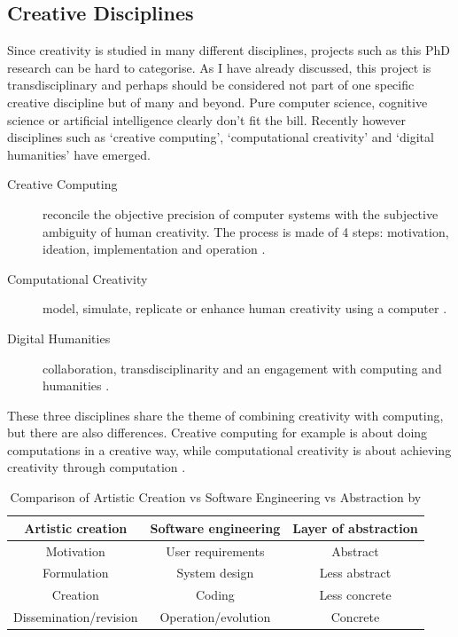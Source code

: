 \subsection{Creative Disciplines}

Since creativity is studied in many different disciplines, projects such as this PhD research can be hard to categorise. As I have already discussed, this project is transdisciplinary and perhaps should be considered not part of one specific creative discipline but of many and beyond. Pure computer science, cognitive science or artificial intelligence clearly don't fit the bill. Recently however disciplines such as `creative computing', `computational creativity' and `digital humanities' have emerged.

\begin{description}
  \item [Creative Computing] reconcile the objective precision of computer systems with the subjective ambiguity of human creativity. The process is made of 4 steps: motivation, ideation, implementation and operation \autocite{Hugill2013c}.
  \item [Computational Creativity] model, simulate, replicate or enhance human creativity using a computer \autocite{Colton2012}.
  \item [Digital Humanities] collaboration, transdisciplinarity and an engagement with computing and humanities \autocite{Burdick2012}.
\end{description}

These three disciplines share the theme of combining creativity with computing, but there are also differences. Creative computing for example is about doing computations in a creative way, while computational creativity is about achieving creativity through computation \autocite{Hugill2013}.

\begin{table}[htbp]
\centering
\begin{tabu}{ccc}
\toprule
\textbf{Artistic creation} & \textbf{Software engineering} & \textbf{Layer of abstraction} \\
\midrule
Motivation & User requirements & Abstract \\
Formulation & System design & Less abstract \\
Creation & Coding & Less concrete \\
Dissemination/revision & Operation/evolution & Concrete \\
\bottomrule
\end{tabu}
\caption[Artistic Creation vs Software Engineering vs Abstraction]{Comparison of Artistic Creation vs Software Engineering vs Abstraction by \autocite{Hugill2013c}}
\label{tab:acsea}
\end{table}

